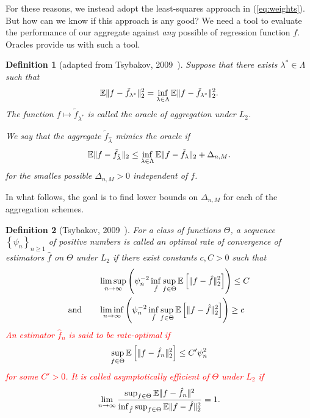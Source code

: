 \documentclass[12pt, letter paper]{article}
\newcommand{\1}{\mathmybb{1}}
\newtheorem{definition}{Definition}[section]
\newcommand{\0}{\emptyset}
\newcommand{\E}{\mathbb{E}}
\newcommand{\Ep}[1]{\mathbb{E}\left[ #1 \right]}
\newcommand{\paren}[1]{\left(#1 \right)}
\newcommand{\set}[1]{\left\{ #1 \right\}}
\newcommand{\norm}[1]{|\hspace{-1pt}|#1 |\hspace{-1pt}|}
\newcommand{\normsq}[1]{\norm{#1}^{2}}
\newcommand{\ftilde}[1]{\tilde{f}_{#1}}
\newcommand{\lambdahat}[1]{\hat{\lambda}_{#1}}
\begin{document}
For these reasons, we instead adopt the least-squares approach in (\ref{eq:weights}). But how can we know if this approach is any good? We need a tool to evaluate the performance of our aggregate against \emph{any} possible of regression function \(f\). Oracles provide us with such a tool. 

\begin{definition}[adapted from Tsybakov, 2009~\cite{tsybakov_introduction_2009}]
    Suppose that there exists \(\lambda^{*}\in\Lambda\) such that 
    \[\E\normsq{f-\ftilde{\lambda^{*}}}_{2} = \inf_{\lambda\in\Lambda}\E\normsq{f-\ftilde{\lambda^{*}}}_{2}.\]
    The function \(f\mapsto \ftilde{\lambda^{*}}\) is called the oracle of aggregation under \(L_{2}\).

    We say that the aggregate \(\ftilde{\lambdahat{}}\) {mimics} the oracle if
    \begin{equation}\label{eq:oracleineq}
        \E\norm{f - \ftilde{\lambdahat{}}}_{2} \leq \inf_{\lambda\in\Lambda}\E\norm{f - \ftilde{\lambda}}_{2} + \Delta_{n,M}.
    \end{equation}
    for the smalles possible \(\Delta_{n,M}>0\) independent of \(f\).
\end{definition}

In what follows, the goal is to find lower bounds on \(\Delta_{n,M}\) for each of the aggregation schemes. 

\begin{definition}[Tsybakov, 2009~\cite{tsybakov_introduction_2009}]
    For a class of functions \(\Theta\), a sequence \(\set{\psi_{n}}_{n\geq1}\) of positive numbers is called an \emph{optimal rate of convergence} of estimators \(\hat{f}\) on \(\Theta\) under \(L_{2}\) if there exist constants \(c, C>0\) such that
    \begin{align}
        &\limsup_{n\to\infty}\paren{\psi_{n}^{-2}\inf_{\hat{f}}\sup_{f\in\Theta}\Ep{\norm{f - \hat{f}}_{2}^{2}}}\leq C\\
        \text{and}\qquad&\liminf_{n\to\infty}\paren{\psi_{n}^{-2}\inf_{\hat{f}}\sup_{f\in\Theta}\Ep{\norm{f - \hat{f}}_{2}^{2}}}\geq c
    \end{align}
    \textcolor{red}{An estimator \(\hat{f}_{n}\) is said to be \emph{rate-optimal} if 
    \[\sup_{f\in\Theta}\Ep{\norm{f - \hat{f}_{n}}_{2}^{2}} \leq C'\psi_{n}^{2}\]
    for some \(C'>0\). It is called \emph{asymptotically efficient} of \(\Theta\) under \(L_{2}\) if 
    \[\lim_{n\to\infty}\frac{\sup_{f\in\Theta}\E{\normsq{f-\hat{f}_{n}}}}{\inf_{\hat{f}}\sup_{f\in\Theta}\E{\norm{f - \hat{f}}_{2}^{2}}}=1.\]}
\end{definition}
\end{document}
